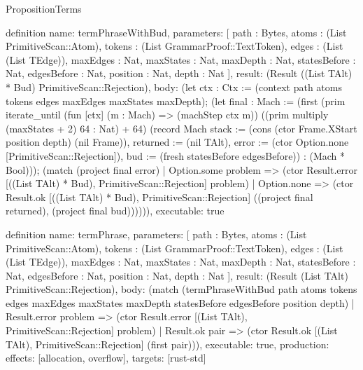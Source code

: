 \begin{lexlean}{PropositionTerms}
\begin{semanticmodule}
definition{
  name: termPhraseWithBud,
  parameters: [
    path : Bytes,
    atoms : (List PrimitiveScan::Atom),
    tokens : (List GrammarProof::TextToken),
    edges : (List (List TEdge)),
    maxEdges : Nat,
    maxStates : Nat,
    maxDepth : Nat,
    statesBefore : Nat,
    edgesBefore : Nat,
    position : Nat,
    depth : Nat
  ],
  result: (Result ((List TAlt) * Bud) PrimitiveScan::Rejection),
  body: (let ctx : Ctx := (context path atoms tokens edges maxEdges maxStates maxDepth); (let final : Mach := (first (prim iterate_until (fun [ctx] (m : Mach) => (machStep ctx m)) ((prim multiply (maxStates + 2) 64 : Nat) + 64) (record Mach {stack := (cons (ctor Frame.XStart position depth) (nil Frame)), returned := (nil TAlt), error := (ctor Option.none [PrimitiveScan::Rejection]), bud := (fresh statesBefore edgesBefore)}) : (Mach * Bool))); (match (project final error)
    | Option.some problem => (ctor Result.error [((List TAlt) * Bud), PrimitiveScan::Rejection] problem)
    | Option.none => (ctor Result.ok [((List TAlt) * Bud), PrimitiveScan::Rejection] ((project final returned), (project final bud)))))),
  executable: true
}

definition{
  name: termPhrase,
  parameters: [
    path : Bytes,
    atoms : (List PrimitiveScan::Atom),
    tokens : (List GrammarProof::TextToken),
    edges : (List (List TEdge)),
    maxEdges : Nat,
    maxStates : Nat,
    maxDepth : Nat,
    statesBefore : Nat,
    edgesBefore : Nat,
    position : Nat,
    depth : Nat
  ],
  result: (Result (List TAlt) PrimitiveScan::Rejection),
  body: (match (termPhraseWithBud path atoms tokens edges maxEdges maxStates maxDepth statesBefore edgesBefore position depth)
    | Result.error problem => (ctor Result.error [(List TAlt), PrimitiveScan::Rejection] problem)
    | Result.ok pair => (ctor Result.ok [(List TAlt), PrimitiveScan::Rejection] (first pair))),
  executable: true,
  production: {effects: [allocation, overflow], targets: [rust-std]}
}
\end{semanticmodule}
\end{lexlean}
